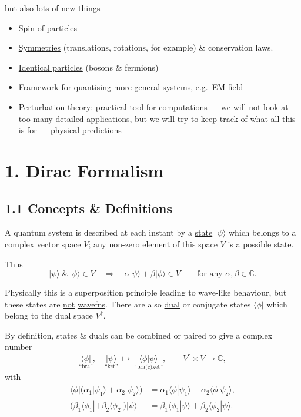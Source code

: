 \documentclass[11pt,a4paper]{article}
\begin{document}
but also lots of new things
\begin{itemize}
    \item \underline{Spin} of particles
    
    \item \underline{Symmetries} (translations, rotations, for example)
    \& conservation laws.
    
    \item \underline{Identical particles} (bosons \& fermions)
    
    \item Framework for quantising more general systems,
    e.g.\ EM field
    
    \item \underline{Perturbation theory}: practical tool for computations ---
    we will not look at too many detailed applications, but we
    will try to keep track of what all this is for --- physical predictions
\end{itemize}

\section*{1. Dirac Formalism}

\subsection*{1.1 Concepts \& Definitions}

A quantum system is described at each instant by a \underline{state}
$|\psi\rangle$ which belongs to a complex vector space $V$;
any non-zero element of this space $V$ is a possible state.

Thus
\[
    |\psi\rangle \ \&\ |\phi\rangle \in V
    \quad\Rightarrow\quad
    \alpha|\psi\rangle+\beta|\phi\rangle\in V
    \qquad
    \text{for any }\alpha,\beta\in\mathbb{C}.
\]

Physically this is a superposition principle leading to wave-like behaviour,
but these states are \underline{not} \underline{wavefns}.
There are also \underline{dual} or conjugate states
$\langle\phi|$ which belong to the dual space $V^\dagger$.

By definition, states \& duals can be combined or paired to give a
complex number
\[
    \underset{\text{``bra''}}{\langle\phi|},
    \quad
    \underset{\text{``ket''}}{|\psi\rangle}
    \ \longmapsto\
    \underset{\text{``bra(c)ket''}}{\langle\phi|\psi\rangle},
    \qquad
    V^\dagger\times V\to\mathbb{C},
\]
with
\begin{align*}
    \langle\phi|
    \bigl(\alpha_1|\psi_1\rangle+\alpha_2|\psi_2\rangle\bigr)
    &=
    \alpha_1\langle\phi|\psi_1\rangle
    +\alpha_2\langle\phi|\psi_2\rangle,\\
    \bigl(\beta_1\langle\phi_1|+\beta_2\langle\phi_2|\bigr)
    |\psi\rangle
    &=
    \beta_1\langle\phi_1|\psi\rangle
    +\beta_2\langle\phi_2|\psi\rangle.
\end{align*}
\end{document}
